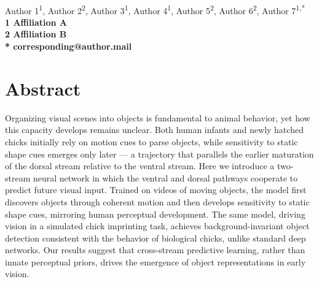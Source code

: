 \documentclass[10pt,letterpaper]{article}
\begin{document}
\vspace*{0.35in}

\begin{flushleft}
{\Large
\textbf{}
}
\newline
\\
Author 1\textsuperscript{1},
Author 2\textsuperscript{2},
Author 3\textsuperscript{1},
Author 4\textsuperscript{1},
Author 5\textsuperscript{2},
Author 6\textsuperscript{2},
Author 7\textsuperscript{1,*}
\\
\bigskip
\bf{1} Affiliation A
\\
\bf{2} Affiliation B
\\
\bigskip
* corresponding@author.mail

\end{flushleft}

\section*{Abstract}
Organizing visual scenes into objects is fundamental to animal behavior, yet how this capacity develops remains unclear. Both human infants and newly hatched chicks initially rely on motion cues to parse objects, while sensitivity to static shape cues emerges only later --- a trajectory that parallels the earlier maturation of the dorsal stream relative to the ventral stream. Here we introduce a two-stream neural network in which the ventral and dorsal pathways cooperate to predict future visual input. Trained on videos of moving objects, the model first discovers objects through coherent motion and then develops sensitivity to static shape cues, mirroring human perceptual development. The same model, driving vision in a simulated chick imprinting task, achieves background-invariant object detection consistent with the behavior of biological chicks, unlike standard deep networks. Our results suggest that cross-stream predictive learning, rather than innate perceptual priors, drives the emergence of object representations in early vision.

\linenumbers
\end{document}
